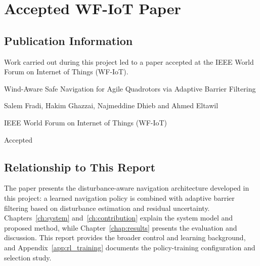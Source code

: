 \chapter{Accepted WF-IoT Paper}
\label{app:wfiot}

\section{Publication Information}
Work carried out during this project led to a paper accepted at the IEEE World Forum on Internet of Things (WF-IoT).

\begin{description}[style=nextline,leftmargin=0pt,labelwidth=0pt,labelsep=0pt]
\item[Title] Wind-Aware Safe Navigation for Agile Quadrotors via Adaptive Barrier Filtering
\item[Authors] Salem Fradi, Hakim Ghazzai, Najmeddine Dhieb and Ahmed Eltawil
\item[Venue] IEEE World Forum on Internet of Things (WF-IoT)
\item[Status] Accepted
\end{description}

\section{Relationship to This Report}
The paper presents the disturbance-aware navigation architecture developed in this project: a learned navigation policy is combined with adaptive barrier filtering based on disturbance estimation and residual uncertainty. Chapters~\ref{ch:system} and~\ref{ch:contribution} explain the system model and proposed method, while Chapter~\ref{chap:results} presents the evaluation and discussion. This report provides the broader control and learning background, and Appendix~\ref{app:rl_training} documents the policy-training configuration and selection study.
